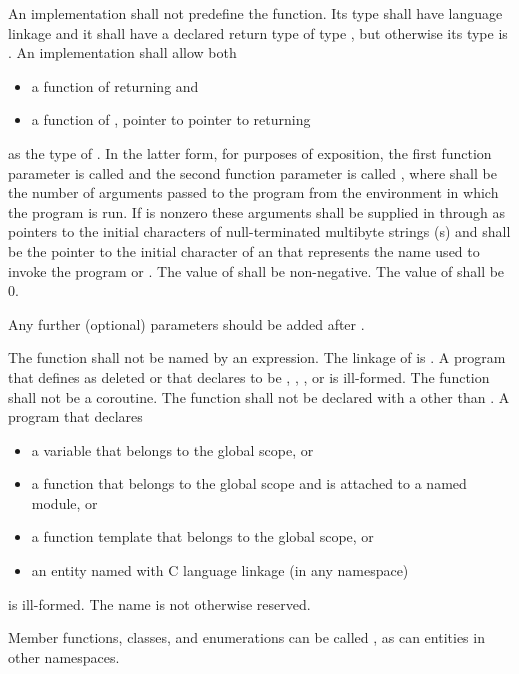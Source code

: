 \pnum
An implementation shall not predefine the  function.
Its type shall have \Cpp{} language linkage
and it shall have a declared return type of type
, but otherwise its type is .
%
An implementation shall allow both
\begin{itemize}
\item a function of \tcode{()} returning  and
\item a function of , pointer to pointer to  returning 
\end{itemize}
%
%
as the type of .
%
%
In the latter form, for purposes of exposition, the first function
parameter is called  and the second function parameter is
called , where  shall be the number of
arguments passed to the program from the environment in which the
program is run. If
 is nonzero these arguments shall be supplied in
 through  as pointers to the initial
characters of null-terminated multibyte strings (\ntmbs{}s)
and  shall be the pointer to
the initial character of an \ntmbs{} that represents the name used to
invoke the program or . The value of  shall be
non-negative. The value of  shall be 0.

\recommended
Any further (optional) parameters should be added after .

\pnum
The function  shall not be named by an expression.
%
The linkage of  is
. A program that defines  as
deleted or that declares  to be
, , , or  is ill-formed.
The function  shall not be a coroutine.
The  function shall not be declared with a
 other than .
A program that declares
\begin{itemize}
\item
a variable  that belongs to the global scope, or
\item
a function  that belongs to the global scope and
is attached to a named module, or
\item
a function template  that belongs to the global scope, or
\item
an entity named 
with C language linkage (in any namespace)
\end{itemize}
is ill-formed.
The name  is
not otherwise reserved.
\begin{example}
Member functions, classes, and
enumerations can be called , as can entities in other
namespaces.
\end{example}

